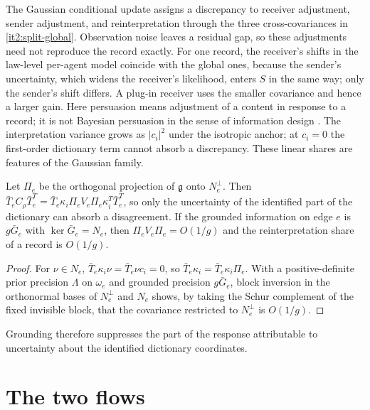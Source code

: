 The Gaussian conditional update assigns a discrepancy to receiver adjustment, sender adjustment, and reinterpretation through the three cross-covariances in \cref{it2:split-global}. Observation noise leaves a residual gap, so these adjustments need not reproduce the record exactly. For one record, the receiver's shifts in the law-level per-agent model coincide with the global ones, because the sender's uncertainty, which widens the receiver's likelihood, enters $S$ in the same way; only the sender's shift differs. A plug-in receiver uses the smaller covariance and hence a larger gain. Here persuasion means adjustment of a content in response to a record; it is not Bayesian persuasion in the sense of information design \citep{KamenicaGentzkow2011}. The interpretation variance grows as $|c_i|^2$ under the isotropic anchor; at $c_i=0$ the first-order dictionary term cannot absorb a discrepancy. These linear shares are features of the Gaussian family.

Let $\Pi_e$ be the orthogonal projection of $\mathfrak g$ onto $N_e^\perp$. Then $\bar T_eC_\rho\bar T_e^T=\bar T_e\kappa_i\Pi_eV_e\Pi_e\kappa_i^T\bar T_e^T$, so only the uncertainty of the identified part of the dictionary can absorb a disagreement. If the grounded information on edge $e$ is $g\bar G_e$ with $\ker\bar G_e=N_e$, then $\Pi_eV_e\Pi_e=O(1/g)$ and the reinterpretation share of a record is $O(1/g)$.
\begin{proof}
For $\nu\in N_e$, $\bar T_e\kappa_i\nu=\bar T_e\nu c_i=0$, so $\bar T_e\kappa_i=\bar T_e\kappa_i\Pi_e$. With a positive-definite prior precision $\Lambda$ on $\omega_e$ and grounded precision $g\bar G_e$, block inversion in the orthonormal bases of $N_e^\perp$ and $N_e$ shows, by taking the Schur complement of the fixed invisible block, that the covariance restricted to $N_e^\perp$ is $O(1/g)$.
\end{proof}

Grounding therefore suppresses the part of the response attributable to uncertainty about the identified dictionary coordinates.

\section{The two flows}
\label{it2:ch-flows}


